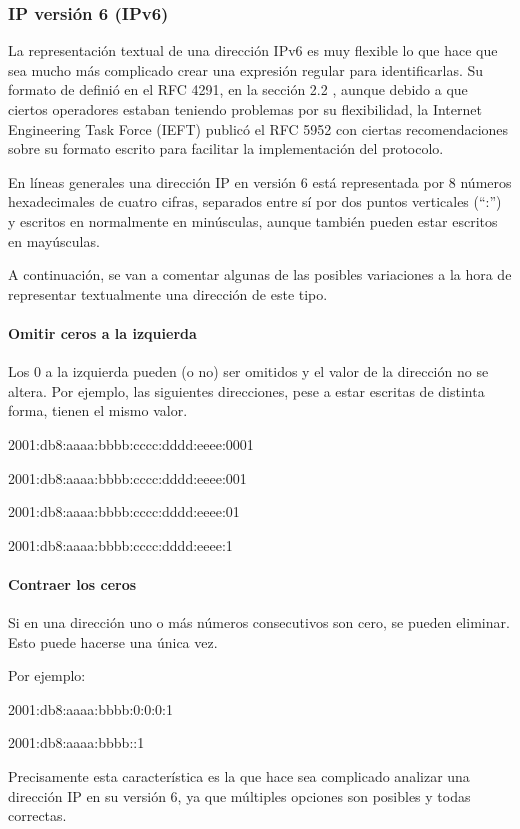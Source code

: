 \subsubsection{IP versión 6 (IPv6)}
La representación textual de una dirección IPv6 es muy flexible lo que hace que sea mucho más complicado crear una expresión regular para identificarlas. Su formato de definió en el RFC 4291, en la sección 2.2 \cite{rfc4291_section2_2}, aunque debido a que ciertos operadores estaban teniendo problemas por su flexibilidad, la Internet Engineering Task Force (IEFT) publicó el RFC 5952 \cite{rfc5952} con ciertas recomendaciones sobre su formato escrito para facilitar la implementación del protocolo. 

En líneas generales una dirección IP en versión 6 está representada por 8 números hexadecimales de cuatro cifras, separados entre sí por dos puntos verticales (“:”) y escritos en normalmente en minúsculas, aunque también pueden estar escritos en mayúsculas. 

A continuación, se van a comentar algunas de las posibles variaciones a la hora de representar textualmente una dirección de este tipo. 
 
\paragraph{Omitir ceros a la izquierda}
Los 0 a la izquierda pueden (o no) ser omitidos y el valor de la dirección no se altera. Por ejemplo, las siguientes direcciones, pese a estar escritas de distinta forma, tienen el mismo valor.  

      2001:db8:aaaa:bbbb:cccc:dddd:eeee:0001

      2001:db8:aaaa:bbbb:cccc:dddd:eeee:001

      2001:db8:aaaa:bbbb:cccc:dddd:eeee:01

      2001:db8:aaaa:bbbb:cccc:dddd:eeee:1

\paragraph{Contraer los ceros}
Si en una dirección uno o más números consecutivos son cero, se pueden eliminar. Esto puede hacerse una única vez.

Por ejemplo:

      2001:db8:aaaa:bbbb:0:0:0:1

      2001:db8:aaaa:bbbb::1
      
Precisamente esta característica es la que hace sea complicado analizar una dirección IP en su versión 6, ya que múltiples opciones son posibles y todas correctas.

